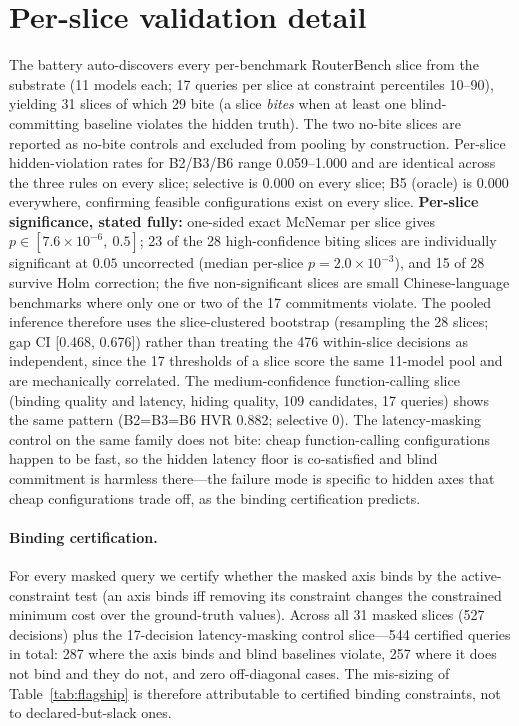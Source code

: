 \documentclass{article} %
\begin{document}
\section{Per-slice validation detail}
\label{app:slices}
The battery auto-discovers every per-benchmark RouterBench slice from the substrate (11 models each; 17 queries per slice at constraint percentiles 10--90), yielding 31 slices of which 29 bite (a slice \emph{bites} when at least one blind-committing baseline violates the hidden truth). The two no-bite slices are reported as no-bite controls and excluded from pooling by construction. Per-slice hidden-violation rates for B2/B3/B6 range 0.059--1.000 and are identical across the three rules on every slice; selective is 0.000 on every slice; B5 (oracle) is 0.000 everywhere, confirming feasible configurations exist on every slice. \textbf{Per-slice significance, stated fully:} one-sided exact McNemar per slice gives $p \in [7.6 \times 10^{-6},\ 0.5]$; 23 of the 28 high-confidence biting slices are individually significant at $0.05$ uncorrected (median per-slice $p = 2.0 \times 10^{-3}$), and 15 of 28 survive Holm correction; the five non-significant slices are small Chinese-language benchmarks where only one or two of the 17 commitments violate. The pooled inference therefore uses the slice-clustered bootstrap (resampling the 28 slices; gap CI [0.468, 0.676]) rather than treating the 476 within-slice decisions as independent, since the 17 thresholds of a slice score the same 11-model pool and are mechanically correlated. The medium-confidence function-calling slice (binding quality and latency, hiding quality, 109 candidates, 17 queries) shows the same pattern (B2=B3=B6 HVR 0.882; selective 0). The latency-masking control on the same family does not bite: cheap function-calling configurations happen to be fast, so the hidden latency floor is co-satisfied and blind commitment is harmless there---the failure mode is specific to hidden axes that cheap configurations trade off, as the binding certification predicts.

\paragraph{Binding certification.}
For every masked query we certify whether the masked axis binds by the active-constraint test (an axis binds iff removing its constraint changes the constrained minimum cost over the ground-truth values). Across all 31 masked slices (527 decisions) plus the 17-decision latency-masking control slice---544 certified queries in total: 287 where the axis binds and blind baselines violate, 257 where it does not bind and they do not, and zero off-diagonal cases. The mis-sizing of Table~\ref{tab:flagship} is therefore attributable to certified binding constraints, not to declared-but-slack ones.
\end{document}
